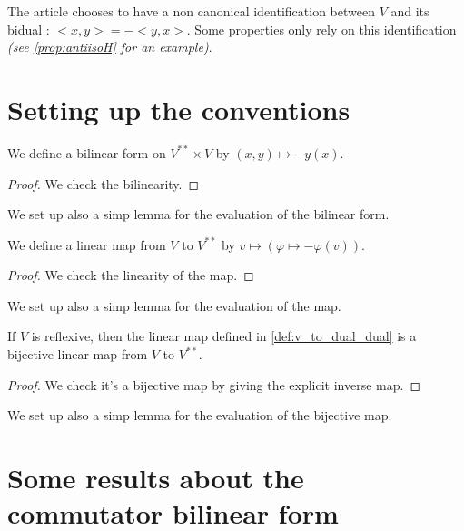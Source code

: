 The article chooses to have a non canonical identification between $V$ and its bidual :
$<x,y>=-<y,x>$. Some properties only rely on this identification
 \textit{(see \ref{prop:antiisoH} for an example)}.

\section{Setting up the conventions}

\begin{definition}
    \label{def:form_dual}
    \uses{}
    \leanok 

    We define a bilinear form on $V^{**}\times V$ by 
    $(x,y)\mapsto - y(x)$.
    \begin{proof}
        \leanok
        We check the bilinearity.
    \end{proof}
\end{definition}
We set up also a simp lemma for the evaluation of the bilinear form.

\begin{definition}
    \label{def:v_to_dual_dual}
    \uses{}
    \leanok 

    We define a linear map from $V$ to $V^{**}$ by 
    $v\mapsto (\varphi\mapsto -\varphi(v))$.
    \begin{proof}
        \leanok
        We check the linearity of the map.
    \end{proof}
\end{definition}
We set up also a simp lemma for the evaluation of the map.

\begin{proposition}
    \label{def:identification_dual}
    \leanok 

    If $V$ is reflexive, then the linear map defined in \ref{def:v_to_dual_dual} is
    a bijective linear map from $V$ to $V^{**}$.
\end{proposition}
\begin{proof}
    \leanok
    We check it's a bijective map by giving the explicit inverse map.
\end{proof}
We set up also a simp lemma for the evaluation of the bijective map.

\section{Some results about the commutator bilinear form}

